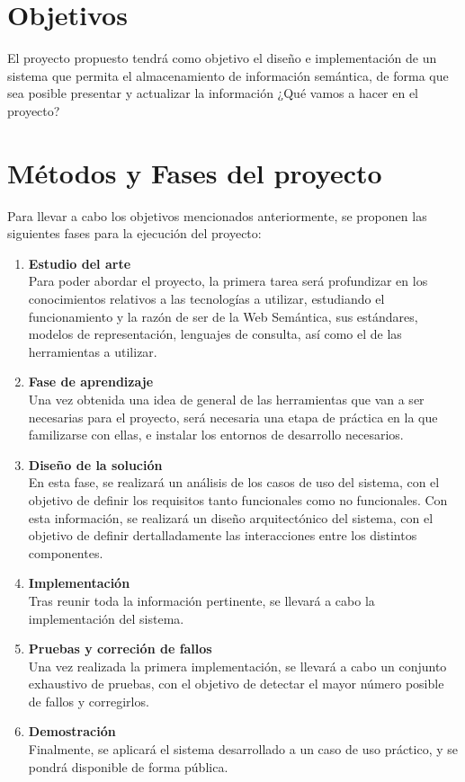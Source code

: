 \documentclass[a4paper,11pt]{report}
\begin{document}
\chapter*{Objetivos}

El proyecto propuesto tendrá como objetivo el diseño e implementación de un sistema que permita el almacenamiento de información semántica, de forma que sea posible presentar y actualizar la información
¿Qué vamos a hacer en el proyecto?

\chapter*{Métodos y Fases del proyecto}

Para llevar a cabo los objetivos mencionados anteriormente, se proponen las siguientes fases para la ejecución del proyecto:
\begin{enumerate}
  \item \textbf{Estudio del arte } ~\\
  Para poder abordar el proyecto, la primera tarea será profundizar en los conocimientos relativos a las tecnologías a utilizar, estudiando el funcionamiento y la razón de ser de la Web Semántica, sus estándares, modelos de representación, lenguajes de consulta, así como el de las herramientas a utilizar.
  \item \textbf{Fase de aprendizaje} ~\\
  Una vez obtenida una idea de general de las herramientas que van a ser necesarias para el proyecto, será necesaria una etapa de práctica en la que familizarse con ellas, e instalar los entornos de desarrollo necesarios.
  \item \textbf{Diseño de la solución} ~\\ 
  En esta fase, se realizará un análisis de los casos de uso del sistema, con el objetivo de definir los requisitos tanto funcionales como no funcionales. Con esta información, se realizará un diseño arquitectónico del sistema, con el objetivo de definir dertalladamente las interacciones entre los distintos componentes.
  \item \textbf{Implementación} ~\\
  Tras reunir toda la información pertinente, se llevará a cabo la implementación del sistema.
  \item \textbf{Pruebas y correción de fallos} ~\\
  Una vez realizada la primera implementación, se llevará a cabo un conjunto exhaustivo de pruebas, con el objetivo de detectar el mayor número posible de fallos y corregirlos.
  \item \textbf{Demostración } ~\\
  Finalmente, se aplicará el sistema desarrollado a un caso de uso práctico, y se pondrá disponible de forma pública.
\end{enumerate}
\end{document}

